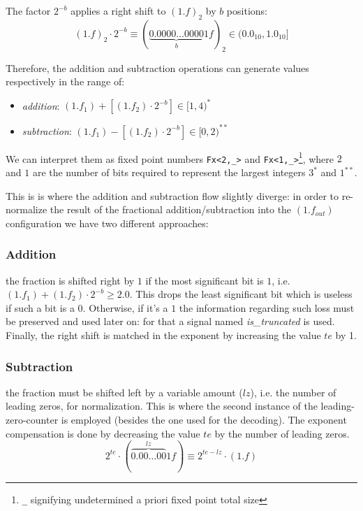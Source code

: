The factor $2^{-b}$ applies a right shift to $(1.f)_2$ by $b$ positions:
$$
(1.f)_2 \cdot 2^{-b} \equiv (\underbrace{0.0000\dots0000}_{b}1f)_2 \in (0.0_{10}, 1.0_{10}]
$$



Therefore, the addition and subtraction operations can generate values respectively in the range of:
\begin{itemize}
    \item \textit{addition}: $(1.f_1) + [(1.f_2) \cdot 2^{-b}] \in [1, 4)^{*}$
    \item \textit{subtraction}: $(1.f_1) - [(1.f_2) \cdot 2^{-b}] \in [0, 2)^{**}$
\end{itemize}
We can interpret them as fixed point numbers \texttt{Fx<2,\_>} and \texttt{Fx<1,\_>}\footnote{\texttt{\_} signifying undetermined a priori fixed point total size}, where $2$ and $1$ are the number of bits required to represent the largest integers $3^{*}$ and $1^{**}$.

This is is where the addition and subtraction flow slightly diverge: in order to re-normalize the result of the fractional addition/subtraction into the $(1.f_{out})$ configuration we have two different approaches:

    \subsubsection{Addition}
    the fraction is shifted right by $1$ if the most significant bit is $1$, i.e. $(1.f_1) + (1.f_2) \cdot 2^{-b} \ge 2.0$. 
    This drops the least significant bit which is useless if such a bit is a $0$. Otherwise, if it's a $1$ the information regarding such loss must be preserved and used later on: for that a signal named \textit{is\_truncated} is used. Finally, the right shift is matched in the exponent by increasing the value $te$ by 1.
    \subsubsection{Subtraction}
    the fraction must be shifted left by a variable amount ($lz$), i.e. the number of leading zeros, for normalization. This is where the second instance of the leading-zero-counter is employed (besides the one used for the decoding). The exponent compensation is done by decreasing the value $te$ by the number of leading zeros.
    $$
    2^{te} \cdot (\overbrace{0.00\dots00}^{lz}1f) \equiv 2^{te - lz} \cdot (1.f)
    $$

